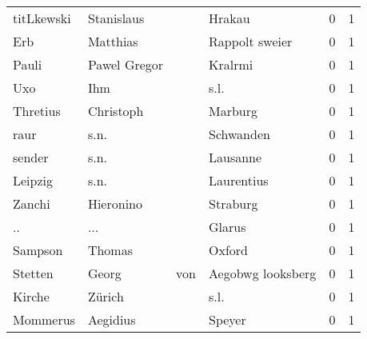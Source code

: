 \begin{center}
\begin{tiny}
\begin{longtabu}{llllrr}
               titLkewski &                         Stanislaus &             &                                      Hrakau &          0 &         1 \\
                      Erb &                           Matthias &             &                              Rappolt sweier &          0 &         1 \\
                    Pauli &                       Pawel Gregor &             &                                     Kralrmi &          0 &         1 \\
                      Uxo &                                Ihm &             &                                        s.l. &          0 &         1 \\
                 Thretius &                          Christoph &             &                                     Marburg &          0 &         1 \\
                     raur &                               s.n. &             &                                   Schwanden &          0 &         1 \\
                   sender &                               s.n. &             &                                    Lausanne &          0 &         1 \\
                  Leipzig &                               s.n. &             &                                  Laurentius &          0 &         1 \\
                   Zanchi &                          Hieronino &             &                                    Straburg &          0 &         1 \\
                       .. &                                ... &             &                                      Glarus &          0 &         1 \\
                  Sampson &                             Thomas &             &                                      Oxford &          0 &         1 \\
                  Stetten &                              Georg &         von &                           Aegobwg looksberg &          0 &         1 \\
                   Kirche &                             Zürich &             &                                        s.l. &          0 &         1 \\
                 Mommerus &                           Aegidius &             &                                      Speyer &          0 &         1 \\

\end{longtabu}
\end{tiny}
\end{center}
